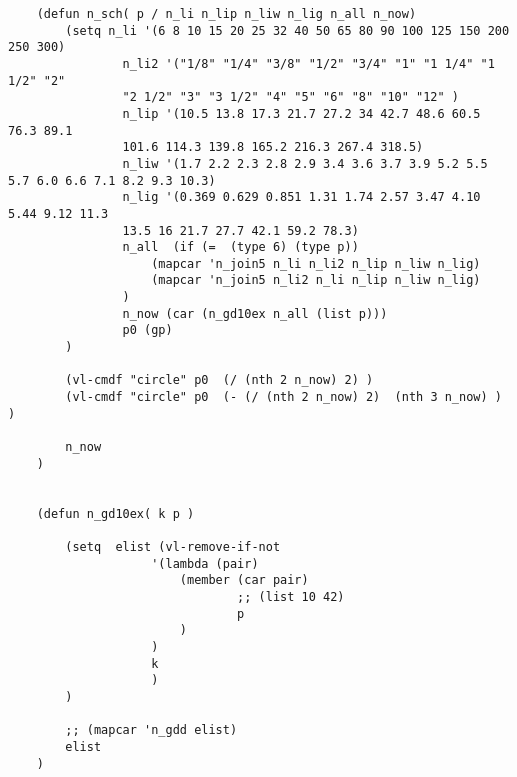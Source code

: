 \documentclass[UTF8]{ctexart}
\begin{document}
\begin{lstlisting}[style=v1]



    (defun n_sch( p / n_li n_lip n_liw n_lig n_all n_now)
        (setq n_li '(6 8 10 15 20 25 32 40 50 65 80 90 100 125 150 200 250 300)
                n_li2 '("1/8" "1/4" "3/8" "1/2" "3/4" "1" "1 1/4" "1 1/2" "2" 
                "2 1/2" "3" "3 1/2" "4" "5" "6" "8" "10" "12" )
                n_lip '(10.5 13.8 17.3 21.7 27.2 34 42.7 48.6 60.5 76.3 89.1 
                101.6 114.3 139.8 165.2 216.3 267.4 318.5)
                n_liw '(1.7 2.2 2.3 2.8 2.9 3.4 3.6 3.7 3.9 5.2 5.5 5.7 6.0 6.6 7.1 8.2 9.3 10.3)
                n_lig '(0.369 0.629 0.851 1.31 1.74 2.57 3.47 4.10 5.44 9.12 11.3 
                13.5 16 21.7 27.7 42.1 59.2 78.3)
                n_all  (if (=  (type 6) (type p)) 
                    (mapcar 'n_join5 n_li n_li2 n_lip n_liw n_lig) 
                    (mapcar 'n_join5 n_li2 n_li n_lip n_liw n_lig)
                ) 
                n_now (car (n_gd10ex n_all (list p)))
                p0 (gp)
        ) 

        (vl-cmdf "circle" p0  (/ (nth 2 n_now) 2) )
        (vl-cmdf "circle" p0  (- (/ (nth 2 n_now) 2)  (nth 3 n_now) )   )

        n_now
    )


    (defun n_gd10ex( k p )

        (setq  elist (vl-remove-if-not
                    '(lambda (pair)
                        (member (car pair)
                                ;; (list 10 42)
                                p
                        ) 
                    )
                    k
                    )
        )

        ;; (mapcar 'n_gdd elist)
        elist
    )


\end{lstlisting}
\end{document}

